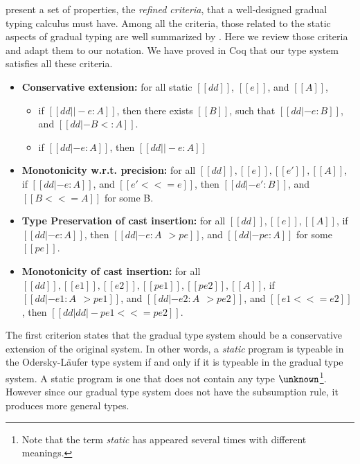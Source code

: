 \citet{siek2015refined} present a set of properties, the \emph{refined criteria}, that a well-designed gradual
typing calculus must have. Among all the
criteria, those related to the static aspects of gradual typing are well
summarized by \citet{cimini2016gradualizer}. Here we review those criteria and
adapt them to our notation. We have proved in Coq that our type system satisfies
all these criteria.

\begin{clemma}\leavevmode
    \begin{itemize}
    \item \textbf{Conservative extension:}
      for all static $[[dd]]$, $[[e]]$, and $[[A]]$,
      \begin{itemize}
      \item if $[[ dd ||- e : A   ]]$,
        then there exists $[[B]]$,
        such that $[[ dd |- e : B  ]]$,
        and $[[  dd |- B <: A  ]]$.
      \item if $[[ dd |- e : A   ]]$,
        then $[[ dd ||- e : A  ]]$
      \end{itemize}
    \item \textbf{Monotonicity w.r.t. precision:}
      for all $[[dd]], [[e]], [[e']], [[A]]$,
      if $[[ dd |- e : A   ]]$,
      and $[[ e' <<= e  ]]$,
      then $[[ dd |- e' : B     ]]$,
      and $[[ B <<= A ]]$ for some B.
    \item \textbf{Type Preservation of cast insertion:}
      for all $[[dd]], [[e]], [[A]]$,
      if $[[ dd |- e : A   ]]$,
      then $[[ dd |- e : A ~~> pe   ]]$,
      and $[[  dd |- pe : A  ]]$ for some $[[pe]]$.
    \item \textbf{Monotonicity of cast insertion:}
      for all $[[dd]], [[e1]], [[e2]], [[pe1]], [[pe2]], [[A]]$,
      if $[[ dd |- e1 : A ~~> pe1   ]]$,
      and $[[ dd |- e2 : A ~~> pe2    ]]$,
      and $[[ e1 <<= e2 ]]$,
      then $[[ dd | dd |- pe1 <<= pe2]]$.
    \end{itemize}
\end{clemma}


The first criterion states that the gradual type system should be a conservative
extension of the original system. In other words, a \emph{static} program
is typeable in the Odersky-L{\"a}ufer type system if and only if it is typeable
in the gradual type system. A static program is one that does not contain any
type $\unknown$\footnote{Note that the term \emph{static} has appeared several
  times with different meanings.}. However since our gradual type system does
not have the subsumption rule, it produces more general types.


